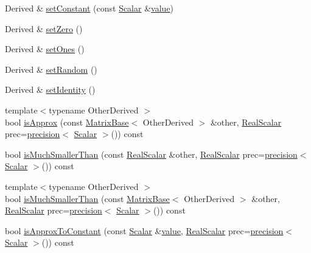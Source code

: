 \begin{DoxyCompactItemize}
\item 
Derived \& \hyperlink{class_matrix_base_a70dd00555d988370fec5e1c9064f6c5e}{set\-Constant} (const \hyperlink{class_matrix_base_a625df8339dc2d816cbc0fd66e7dadaf5}{Scalar} \&\hyperlink{glext_8h_aa0e2e9cea7f208d28acda0480144beb0}{value})
\item 
Derived \& \hyperlink{class_matrix_base_a738cf3b9f141f72dfab2ea69c780605a}{set\-Zero} ()
\item 
Derived \& \hyperlink{class_matrix_base_af9e46e652239d4c8b1ee900e894527f4}{set\-Ones} ()
\item 
Derived \& \hyperlink{class_matrix_base_a4767ced0bda138a2689fcee57256d89e}{set\-Random} ()
\item 
Derived \& \hyperlink{class_matrix_base_ab9afa6647581c8c3f638b4db96bb5f2c}{set\-Identity} ()
\item 
{\footnotesize template$<$typename Other\-Derived $>$ }\\bool \hyperlink{class_matrix_base_a85eb8c7adf519acfa5b74545a6870945}{is\-Approx} (const \hyperlink{class_matrix_base}{Matrix\-Base}$<$ Other\-Derived $>$ \&other, \hyperlink{class_matrix_base_a634804c67de40fec74e3640bc229364c}{Real\-Scalar} prec=\hyperlink{_math_functions_8h_a3dc1c65cf9dc9b5a7ee66472d0ae83e1}{precision}$<$ \hyperlink{class_matrix_base_a625df8339dc2d816cbc0fd66e7dadaf5}{Scalar} $>$()) const 
\item 
bool \hyperlink{class_matrix_base_a83be52db754531e0d700a6c5a6f03641}{is\-Much\-Smaller\-Than} (const \hyperlink{class_matrix_base_a634804c67de40fec74e3640bc229364c}{Real\-Scalar} \&other, \hyperlink{class_matrix_base_a634804c67de40fec74e3640bc229364c}{Real\-Scalar} prec=\hyperlink{_math_functions_8h_a3dc1c65cf9dc9b5a7ee66472d0ae83e1}{precision}$<$ \hyperlink{class_matrix_base_a625df8339dc2d816cbc0fd66e7dadaf5}{Scalar} $>$()) const 
\item 
{\footnotesize template$<$typename Other\-Derived $>$ }\\bool \hyperlink{class_matrix_base_a61eb3a78243a6cc0c389978efc249f93}{is\-Much\-Smaller\-Than} (const \hyperlink{class_matrix_base}{Matrix\-Base}$<$ Other\-Derived $>$ \&other, \hyperlink{class_matrix_base_a634804c67de40fec74e3640bc229364c}{Real\-Scalar} prec=\hyperlink{_math_functions_8h_a3dc1c65cf9dc9b5a7ee66472d0ae83e1}{precision}$<$ \hyperlink{class_matrix_base_a625df8339dc2d816cbc0fd66e7dadaf5}{Scalar} $>$()) const 
\item 
bool \hyperlink{class_matrix_base_a35a547240fba9133b77082f995f672ae}{is\-Approx\-To\-Constant} (const \hyperlink{class_matrix_base_a625df8339dc2d816cbc0fd66e7dadaf5}{Scalar} \&\hyperlink{glext_8h_aa0e2e9cea7f208d28acda0480144beb0}{value}, \hyperlink{class_matrix_base_a634804c67de40fec74e3640bc229364c}{Real\-Scalar} prec=\hyperlink{_math_functions_8h_a3dc1c65cf9dc9b5a7ee66472d0ae83e1}{precision}$<$ \hyperlink{class_matrix_base_a625df8339dc2d816cbc0fd66e7dadaf5}{Scalar} $>$()) const 

\end{DoxyCompactItemize}
